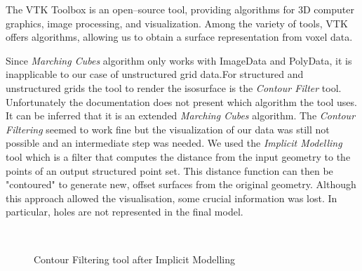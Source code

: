 The VTK Toolbox is an open--source tool, providing algorithms for 3D computer graphics, image processing, and visualization. Among the variety of tools, VTK offers algorithms, allowing us to obtain a surface representation from voxel data. 

Since \textit{Marching Cubes} algorithm only works with ImageData and PolyData, it is inapplicable to our case of unstructured grid data.For structured and unstructured grids the tool to render the isosurface is the \textit{Contour Filter} tool. Unfortunately the documentation does not present which algorithm the tool uses. It
can be inferred that it is an extended \textit{Marching Cubes} algorithm.
The \textit{Contour Filtering} seemed to work fine but the visualization of our data was still not possible
and an intermediate step was needed. We used the \textit{Implicit Modelling} tool which is a filter that
computes the distance from the input geometry to the points of an output structured point set.
This distance function can then be "contoured" to generate new, offset surfaces from the original
geometry. Although this approach allowed the visualisation, some crucial information was lost. In particular, holes are not represented in the final model.  

\begin{figure}
\centering
   \\
   \caption{Contour Filtering tool after Implicit Modelling}
   \label{fig:contouring}
\end{figure}


